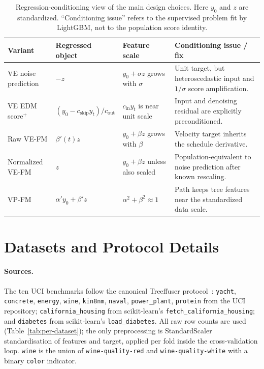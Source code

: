 \documentclass{uai2026}
\begin{document}
\begin{table}[!h]
  \centering
  \caption{Regression-conditioning view of the main design choices. Here $y_0$ and $z$ are standardized. ``Conditioning issue'' refers to the supervised problem fit by LightGBM, not to the population score identity.}\label{tab:conditioning}
  \scriptsize
  \begin{tabular}{p{}p{}p{}p{}}
    \toprule
    Variant & Regressed object & Feature scale & Conditioning issue / fix \\
    \midrule
    VE noise prediction & $-z$ & $y_0+\sigma z$ grows with $\sigma$ & Unit target, but heteroscedastic input and $1/\sigma$ score amplification. \\
    VE EDM score$^+$ & $(y_0-c_{\mathrm{skip}}y_t)/c_{\mathrm{out}}$ & $c_{\mathrm{in}}y_t$ is near unit scale & Input and denoising residual are explicitly preconditioned. \\
    Raw VE-FM & $\beta'(t)z$ & $y_0+\beta z$ grows with $\beta$ & Velocity target inherits the schedule derivative. \\
    Normalized VE-FM & $z$ & $y_0+\beta z$ unless also scaled & Population-equivalent to noise prediction after known rescaling. \\
    VP-FM & $\alpha' y_0+\beta' z$ & $\alpha^2+\beta^2\approx1$ & Path keeps tree features near the standardized data scale. \\
    \bottomrule
  \end{tabular}
\end{table}

\section{Datasets and Protocol Details}\label{app:datasets}

\paragraph{Sources.} The ten UCI benchmarks follow the canonical Treeffuser protocol~\citep{treeffuser}: \texttt{yacht}, \texttt{concrete}, \texttt{energy}, \texttt{wine}, \texttt{kin8nm}, \texttt{naval}, \texttt{power\_plant}, \texttt{protein} from the UCI repository; \texttt{california\_housing} from scikit-learn's \texttt{fetch\_california\_housing}; and \texttt{diabetes} from scikit-learn's \texttt{load\_diabetes}. All raw row counts are used (Table~\ref{tab:per-dataset}); the only preprocessing is StandardScaler standardisation of features and target, applied per fold inside the cross-validation loop. \texttt{wine} is the union of \texttt{wine-quality-red} and \texttt{wine-quality-white} with a binary \texttt{color} indicator.
\end{document}
